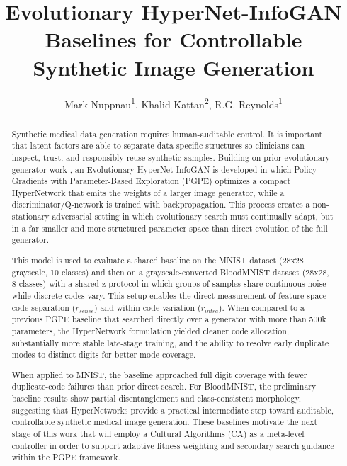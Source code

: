 \documentclass[letterpaper]{article} %
\title{Evolutionary HyperNet-InfoGAN Baselines for Controllable Synthetic Image Generation}
\author{
	Mark Nuppnau\textsuperscript{\rm 1},
	Khalid Kattan\textsuperscript{\rm 2},
	R.G. Reynolds\textsuperscript{\rm 1}\\
}
\begin{document}
	\renewcommand{\bottomfraction}{0.5}
	\maketitle
	
	\begin{abstract}
		Synthetic medical data generation requires human-auditable control. It is important that latent factors are able to separate data-specific structures so clinicians can inspect, trust, and responsibly reuse synthetic samples. Building on prior evolutionary generator work \cite{b1}, an Evolutionary HyperNet-InfoGAN is developed in which Policy Gradients with Parameter-Based Exploration (PGPE) optimizes a compact HyperNetwork that emits the weights of a larger image generator, while a discriminator/Q-network is trained with backpropagation. This process creates a non-stationary adversarial setting in which evolutionary search must continually adapt, but in a far smaller and more structured parameter space than direct evolution of the full generator.
		
		This model is used to evaluate a shared baseline on the MNIST dataset (28x28 grayscale, 10 classes) and then on a grayscale-converted BloodMNIST dataset (28x28, 8 classes) with a shared-z protocol in which groups of samples share continuous noise while discrete codes vary. This setup enables the direct measurement of feature-space code separation ($r_{sense}$) and within-code variation ($r_{intra}$). When compared to a previous PGPE baseline that searched directly over a generator with more than 500k parameters, the HyperNetwork formulation yielded cleaner code allocation, substantially more stable late-stage training, and the ability to resolve early duplicate modes to distinct digits for better mode coverage.
		
		When applied to MNIST, the baseline approached full digit coverage with fewer duplicate-code failures than prior direct search. For BloodMNIST, the preliminary baseline results show partial disentanglement and class-consistent morphology, suggesting that HyperNetworks provide a practical intermediate step toward auditable, controllable synthetic medical image generation. These baselines motivate the next stage of this work that will employ a Cultural Algorithms (CA) as a meta-level controller in order to support adaptive fitness weighting and secondary search guidance within the PGPE framework.
	\end{abstract}
	
	
\end{document}

